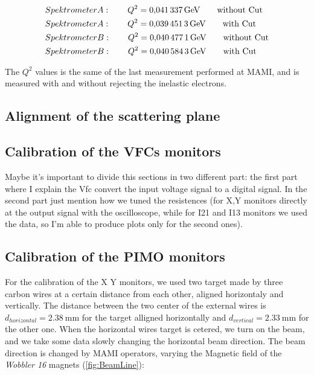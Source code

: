 \begin{flushleft}
\begin{align*}
& Spektrometer A : \qquad Q^{2} = \SI{0.041337}{\giga \electronvolt} \qquad \textnormal{without Cut} \\
& Spektrometer A : \qquad Q^{2} = \SI{0.0394513}{\giga \electronvolt} \qquad \textnormal{with Cut} \\
& Spektrometer B : \qquad Q^{2} = \SI{0.0404771}{\giga \electronvolt} \qquad \textnormal{without Cut} \\
& Spektrometer B : \qquad Q^{2} = \SI{0.0405843}{\giga \electronvolt} \qquad \textnormal{with Cut} 
\end{align*} 
\end{flushleft}

The $Q^{2}$ values is the same of the last measurement performed at MAMI, and is measured with and without rejecting the inelastic electrons. 

\subsection{Alignment of the scattering plane}

\subsection{Calibration of the VFCs monitors}
Maybe it's important to divide this sections in two different part: the first part where I explain the Vfc convert the input voltage signal to a digital signal. In the second part just mention how we tuned the resistences (for X,Y monitors directly at the output signal with the oscilloscope, while for I21 and I13 monitors we used the data, so I'm able to produce plots only for the second ones).

\subsection{Calibration of the PIMO monitors}

For the calibration of the X Y monitors, we used two target made by three carbon wires at a certain distance from each other, aligned horizontaly and vertically. The distance between the two center of the external wires is $ d_{horizontal} = \SI{2.38}{\milli \meter}$ for the target alligned horizontally and $d_{vertical} = \SI{2.33}{\milli \meter}$ for the other one.
When the horizontal wires target is cetered, we turn on the beam, and we take some data slowly changing the horizontal beam direction. The beam direction is changed by MAMI operators, varying the Magnetic field of the \textit{Wobbler 16} magnets (\ref{fig:BeamLine}):

